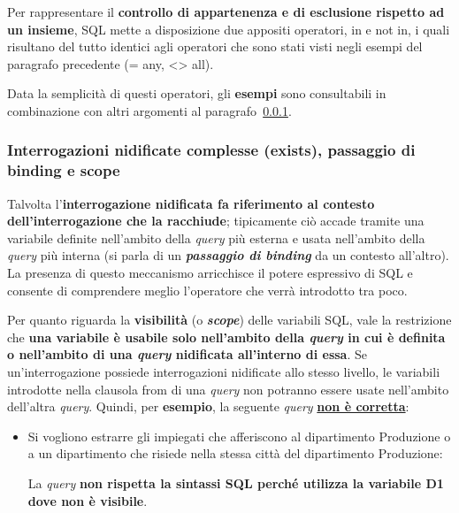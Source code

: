 \documentclass[a4paper]{article}
\begin{document}
	Per rappresentare il \textbf{controllo di appartenenza e di esclusione rispetto ad un insieme}, SQL mette a disposizione due appositi operatori, \textcolor{Red3}{\textsf{in}} e \textcolor{Red3}{\textsf{not in}}, i quali risultano del tutto identici agli operatori che sono stati visti negli esempi del paragrafo precedente (\textsf{= any}, \textsf{<> all}).\newline
	
	\noindent
	Data la semplicità di questi operatori, gli \textcolor{Green4}{\textbf{esempi}} sono consultabili in combinazione con altri argomenti al paragrafo~\ref{par: interrogazioni nidificate complesse (exists)}.\newpage
	
	\subsubsection{Interrogazioni nidificate complesse (\textsf{exists}), passaggio di binding e scope}\label{par: interrogazioni nidificate complesse (exists)}
	
	Talvolta l'\textbf{interrogazione nidificata fa riferimento al contesto dell'interrogazione che la racchiude}; tipicamente ciò accade tramite una variabile definite nell'ambito della \emph{query} più esterna e usata nell'ambito della \emph{query} più interna (si parla di un \textbf{\emph{passaggio di binding}} da un contesto all'altro). La presenza di questo meccanismo arricchisce il potere espressivo di SQL e consente di comprendere meglio l'operatore che verrà introdotto tra poco.\newline
	
	\noindent
	Per quanto riguarda la \textbf{visibilità} (o \textbf{\emph{scope}}) delle variabili SQL, vale la restrizione che \textbf{una variabile è usabile solo nell'ambito della \emph{query} in cui è definita o nell'ambito di una \emph{query} nidificata all'interno di essa}. Se un'interrogazione possiede interrogazioni nidificate allo stesso livello, le variabili introdotte nella clausola \textsf{from} di una \emph{query} non potranno essere usate nell'ambito dell'altra \emph{query}. Quindi, per \textcolor{Green4}{\textbf{esempio}}, la seguente \emph{query} \textbf{\underline{non è corretta}}:
	\begin{itemize}
		\item Si vogliono estrarre gli impiegati che afferiscono al dipartimento Produzione o a un dipartimento che risiede nella stessa città del dipartimento Produzione:
		
		La \emph{query} \textbf{non rispetta la sintassi SQL perché utilizza la variabile \textsf{D1} dove non è visibile}.
	\end{itemize}\:\newline
\end{document}
